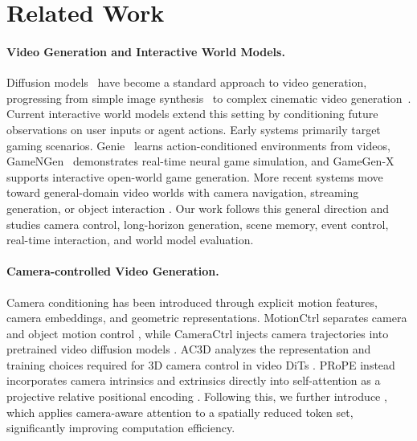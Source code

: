 \section{Related Work}

\paragraph{\bf{Video Generation and Interactive World Models.}}
Diffusion models~\citep{ho2020denoising, song2021scorebasedgenerativemodelingstochastic, peebles2023scalable, song2021scorebasedgenerativemodelingstochastic} have become a standard approach to video generation, progressing
from simple image synthesis~\citep{Chu_2025_ICCV, lei2023maskeddiffusionmodelsfast, lei2026vaeendtoendpixelspacegenerative} to complex cinematic video generation~\citep{wan2025wan, feng2026enhancing}.
Current interactive world models extend this setting by conditioning future observations
on user inputs or agent actions. Early systems primarily target gaming scenarios.
Genie~\citep{bruce2024genie} learns action-conditioned environments from videos, GameNGen~\citep{valevski2024gamengen} demonstrates real-time neural game simulation, and GameGen-X~\citep{che2025gamegen} supports interactive open-world game
generation. More recent systems move toward
general-domain video worlds with camera navigation, streaming generation, or
object interaction
\citep{hyworld2025,gao2026lingbotworld,hong2025relic,
wang2026matrixgame,zhao2026minwm,gu2026worldcraft}.
Our work follows this general direction and studies camera control,
long-horizon generation, scene memory, event control, real-time interaction, and world model evaluation.

\paragraph{\bf{Camera-controlled Video Generation.}}
Camera conditioning has been introduced through explicit motion features,
camera embeddings, and geometric representations. MotionCtrl separates camera
and object motion control \citep{wang2024motionctrl}, while CameraCtrl injects
camera trajectories into pretrained video diffusion models
\citep{he2025cameractrl}. AC3D analyzes the representation and training choices
required for 3D camera control in video DiTs \citep{bahmani2025ac3d}. PRoPE
instead incorporates camera intrinsics and extrinsics directly into
self-attention as a projective relative positional encoding
\citep{li2025cameras}. Following this, 
we further introduce \eprope{}, which applies camera-aware attention to a spatially reduced token set, significantly improving computation efficiency.

